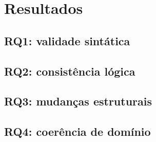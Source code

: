 \section{Resultados}
\label{sec:resultados}

\subsection{RQ1: validade sintática}

\subsection{RQ2: consistência lógica}
\todo{}

\subsection{RQ3: mudanças estruturais}
\todo{}

\subsection{RQ4: coerência de domínio}
\todo{}
